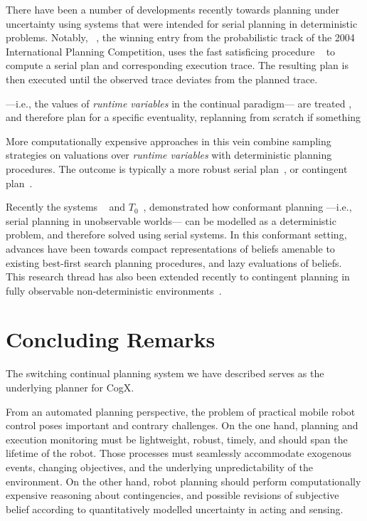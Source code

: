 \documentclass[letterpaper]{article}
\begin{document}
There have been a number of developments recently towards planning
under uncertainty using systems that were intended for serial planning
in deterministic problems.  Notably,
~\cite{yoon:etal:2007}, the winning entry from the
probabilistic track of the 2004 International Planning Competition,
uses the fast satisficing procedure
~\cite{hoffmann:nebel:2001} to compute a serial plan and
corresponding execution trace. The resulting plan is then executed
until the observed trace deviates from the planned trace.

 ---i.e., the values of {\em
runtime variables} in the continual paradigm--- are treated , and
therefore plan for a specific eventuality, replanning from scratch if
something


More computationally expensive approaches in this vein combine
sampling strategies on valuations over {\em runtime variables} with
deterministic planning procedures. The outcome is typically a more
robust serial plan~\cite{yoon:etal:2008}, or contingent
plan~\cite{majercik:2006}.



Recently the systems
~\cite{hoffmann:brafman:2006} and
$T_0$~\cite{palacios:geffner:2009}, demonstrated how conformant
planning ---i.e., serial planning in unobservable worlds--- can be
modelled as a deterministic problem, and therefore solved using serial
systems. In this conformant setting, advances have been towards
compact representations of beliefs amenable to existing best-first
search planning procedures, and lazy evaluations of beliefs. This
research thread has also been extended recently to contingent planning
in fully observable non-deterministic
environments~\cite{albore:etal:2009}.

\section{Concluding Remarks}

The switching continual planning system we have described serves as
the underlying planner for CogX.





From an automated planning perspective, the problem of practical
mobile robot control poses important and contrary challenges.
On the one hand, planning and execution monitoring must be
lightweight, robust, timely, and should span the lifetime of the
robot. Those processes must seamlessly accommodate exogenous events,
changing objectives, and the underlying unpredictability of the
environment.
On the other hand, robot planning should perform computationally
expensive reasoning about contingencies, and possible revisions of
subjective belief according to quantitatively modelled uncertainty in
acting and sensing. 
\end{document}
